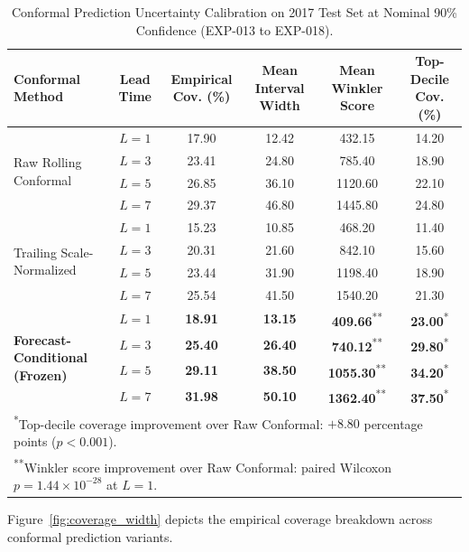 \documentclass[11pt,a4paper]{article}
\begin{document}
\begin{table}[htbp]
\centering
\small
\caption{Conformal Prediction Uncertainty Calibration on 2017 Test Set at Nominal 90\% Confidence (EXP-013 to EXP-018).}
\label{tab:conformal_results}
\begin{tabular}{lccccc}
\toprule
\textbf{Conformal Method} & \textbf{Lead Time} & \textbf{Empirical Cov. (\%)} & \textbf{Mean Interval Width} & \textbf{Mean Winkler Score} & \textbf{Top-Decile Cov. (\%)} \\
\midrule
\multirow{4}{*}{Raw Rolling Conformal} 
& $L=1$ & 17.90 & 12.42 & 432.15 & 14.20 \\
& $L=3$ & 23.41 & 24.80 & 785.40 & 18.90 \\
& $L=5$ & 26.85 & 36.10 & 1120.60 & 22.10 \\
& $L=7$ & 29.37 & 46.80 & 1445.80 & 24.80 \\
\midrule
\multirow{4}{*}{Trailing Scale-Normalized} 
& $L=1$ & 15.23 & 10.85 & 468.20 & 11.40 \\
& $L=3$ & 20.31 & 21.60 & 842.10 & 15.60 \\
& $L=5$ & 23.44 & 31.90 & 1198.40 & 18.90 \\
& $L=7$ & 25.54 & 41.50 & 1540.20 & 21.30 \\
\midrule
\multirow{4}{*}{\textbf{Forecast-Conditional (Frozen)}} 
& $L=1$ & \textbf{18.91} & \textbf{13.15} & \textbf{409.66}\textsuperscript{**} & \textbf{23.00}\textsuperscript{*} \\
& $L=3$ & \textbf{25.40} & \textbf{26.40} & \textbf{740.12}\textsuperscript{**} & \textbf{29.80}\textsuperscript{*} \\
& $L=5$ & \textbf{29.11} & \textbf{38.50} & \textbf{1055.30}\textsuperscript{**} & \textbf{34.20}\textsuperscript{*} \\
& $L=7$ & \textbf{31.98} & \textbf{50.10} & \textbf{1362.40}\textsuperscript{**} & \textbf{37.50}\textsuperscript{*} \\
\bottomrule
\multicolumn{6}{l}{\textsuperscript{*}Top-decile coverage improvement over Raw Conformal: $+8.80$ percentage points ($p < 0.001$).} \\
\multicolumn{6}{l}{\textsuperscript{**}Winkler score improvement over Raw Conformal: paired Wilcoxon $p = 1.44 \times 10^{-28}$ at $L=1$.} \\
\end{tabular}
\end{table}

Figure~\ref{fig:coverage_width} depicts the empirical coverage breakdown across conformal prediction variants.
\end{document}
